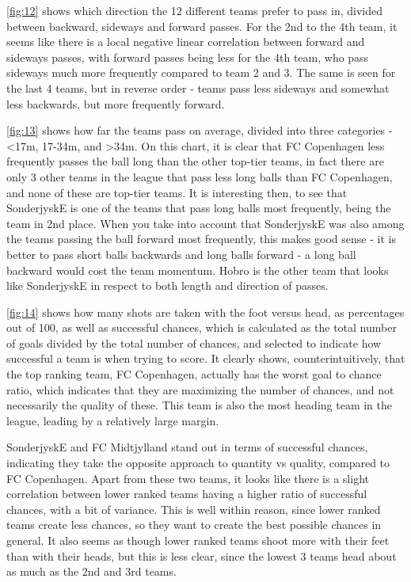 \documentclass[Report.tex]{subfiles}
\begin{document}
\ref{fig:12} shows which direction the 12 different teams prefer to pass in,
divided between backward, sideways and forward passes. For the 2nd to the 4th
team, it seems like there is a local negative linear correlation between forward
and sideways passes, with forward passes being less for the 4th team, who pass
sideways much more frequently compared to team 2 and 3. The same is seen for the
last 4 teams, but in reverse order - teams pass less sideways and somewhat less
backwards, but more frequently forward. 

\ref{fig:13} shows how far the teams pass on average, divided into three
categories - <17m, 17-34m, and >34m. 
On this chart, it is clear that FC Copenhagen less frequently passes the ball
long than the other top-tier teams, in fact there are only 3 other teams in the
league that pass less long balls than FC Copenhagen, and none of these are
top-tier teams. It is interesting then, to see that SonderjyskE is one of the
teams that pass long balls most frequently, being the team in 2nd place. When
you take into account that SonderjyskE was also among the teams passing the ball
forward most frequently, this makes good sense - it is better to pass short
balls backwards and long balls forward - a long ball backward would cost the
team momentum. Hobro is the other team that looks like SonderjyskE in respect to
both length and direction of passes. 

\ref{fig:14} shows how many shots are taken with the foot versus head, as
percentages out of 100, as well as successful chances, which is calculated as
the total number of goals divided by the total number of chances, and selected
to indicate how successful a team is when trying to score. 
It clearly shows, counterintuitively, that the top ranking team, FC Copenhagen,
actually has the worst goal to chance ratio, which indicates that they are
maximizing the number of chances, and not necessarily the quality of these. This
team is also the most heading team in the league, leading by a relatively large
margin. 

SonderjyskE and FC Midtjylland stand out in terms of successful chances,
indicating they take the opposite approach to quantity vs quality, compared to
FC Copenhagen. Apart from these two teams, it looks like there is a slight
correlation between lower ranked teams having a higher ratio of successful
chances, with a bit of variance. This is well within reason, since lower ranked
teams create less chances, so they want to create the best possible chances in
general. It also seems as though lower ranked teams shoot more with their feet
than with their heads, but this is less clear, since the lowest 3 teams head
about as much as the 2nd and 3rd teams. 
\end{document}
